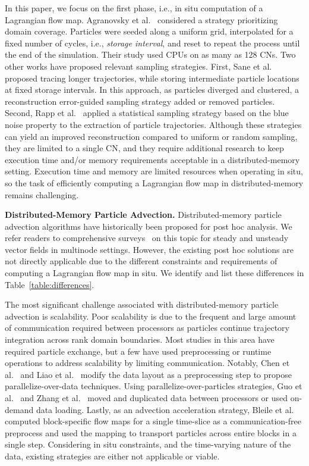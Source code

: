 In this paper, we focus on the first phase, i.e., in situ computation of a Lagrangian flow map.
%
Agranovsky et al.~\cite{agranovsky2014improved} considered a strategy prioritizing domain coverage.
%
Particles were seeded along a uniform grid, interpolated for a fixed number of cycles, i.e., \textit{storage interval}, and reset to repeat the process until the end of the simulation.
%
Their study used CPUs on as many as 128 CNs.
%
Two other works have proposed relevant sampling strategies. 
%
First, Sane et al.~\cite{sane2019interpolation} proposed tracing longer trajectories, while storing intermediate particle locations at fixed storage intervals. 
%
In this approach, as particles diverged and clustered, a reconstruction error-guided sampling strategy added or removed particles.
%
Second, Rapp et al.~\cite{rapp2019void} applied a statistical sampling strategy based on the blue noise property to the extraction of particle trajectories. 
%
Although these strategies can yield an improved reconstruction compared to uniform or random sampling, they are limited to a single CN, and they require additional research to keep execution time and/or memory requirements acceptable in a distributed-memory setting. 
%
Execution time and memory are limited resources when operating in situ, so the task of efficiently computing a Lagrangian flow map in distributed-memory remains challenging.

\textbf{Distributed-Memory Particle Advection.}
%
Distributed-memory particle advection algorithms have historically been proposed for post hoc analysis.
%
We refer readers to comprehensive surveys~\cite{PeterkaRNLSKH11,zhang2018survey} on this topic for steady and unsteady vector fields in multinode settings.
%
However, the existing post hoc solutions are not directly applicable due to the different constraints and requirements of computing a Lagrangian flow map in situ.
%
We identify and list these differences in Table~\ref{table:differences}.

The most significant challenge associated with distributed-memory particle advection is scalability.
%
Poor scalability is due to the frequent and large amount of communication required between processors as particles continue trajectory integration across rank domain boundaries.
%
Most studies in this area have required particle exchange, but a few have used preprocessing or runtime operations to address scalability by limiting communication.
%
Notably, Chen et al.~\cite{ChenXLS12, ChenS13} and Liao et al.~\cite{Liao2019ScalablePF} modify the data layout as a preprocessing step to propose parallelize-over-data techniques.
%
Using parallelize-over-particles strategies, Guo et al.~\cite{GuoHSZHY14} and Zhang et al.~\cite{ZhangGY16} moved and duplicated data between processors or used on-demand data loading.
%
Lastly, as an advection acceleration strategy, Bleile et al.~\cite{bleile2017accelerating} computed block-specific flow maps for a single time-slice as a communication-free preprocess and used the mapping to transport particles across entire blocks in a single step. 
%
Considering in situ constraints, and the time-varying nature of the data, existing strategies are either not applicable or viable. 
%

